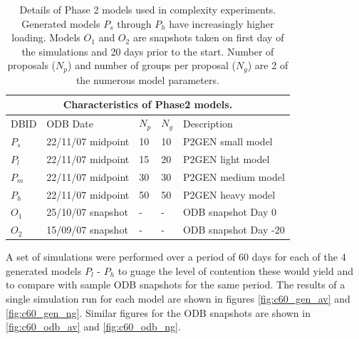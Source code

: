 \begin{table}[h]
 \begin{center}
  \begin{tabular}{lllll}
   \toprule
   \multicolumn{5}{c}{Characteristics of Phase2 models.} \\
   \midrule
   DBID & ODB Date & $N_p$ & $N_g$ & Description\\
   \midrule
   $P_s$ & 22/11/07 midpoint & 10 & 10 & P2GEN small model \\
   $P_l$ & 22/11/07 midpoint & 15 & 20 & P2GEN light model \\
   $P_m$ & 22/11/07 midpoint & 30 & 30 & P2GEN medium model\\
   $P_h$ & 22/11/07 midpoint & 50 & 50 & P2GEN heavy model \\
   \midrule
   $O_1$ & 25/10/07 snapshot & - & - & ODB snapshot Day 0\\
   $O_2$ & 15/09/07 snapshot & - & - & ODB snapshot Day -20\\
   \bottomrule
  \end{tabular}
 \end{center}
\caption[Details of Phase 2 models for complexity experiments]{Details of Phase 2 models used in complexity experiments. Generated models $P_s$ through $P_h$ have increasingly higher loading. Models $O_1$ and $O_2$ are snapshots taken on first day of the simulations and 20 days prior to the start. Number of proposals ($N_p$) and number of groups per proposal ($N_g$) are 2 of the numerous model parameters.}
\label{tab:ltc_p2models}
\end{table}


A set of simulations were performed over a period of 60 days for each of the 4 generated models $P_l$ - $P_h$ to guage the level of contention these would yield and to compare with sample ODB snapshots for the same period. The results of a single simulation run for each model are shown in figures \ref{fig:c60_gen_av} and \ref{fig:c60_gen_ng}. Similar figures for the ODB snapshots are shown in \ref{fig:c60_odb_av} and \ref{fig:c60_odb_ng}.

